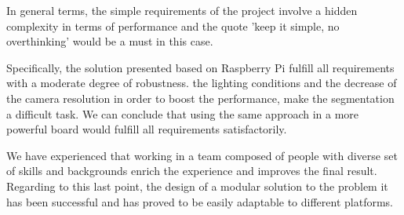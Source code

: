 In general terms, the simple requirements of the project involve a hidden complexity in terms of performance and the quote 'keep it simple, no overthinking' would be a must in this case.

Specifically, the solution presented based on Raspberry Pi fulfill all requirements with a moderate degree of robustness. the lighting conditions and the decrease of the camera resolution in order to boost the performance, make the segmentation a difficult task. We can conclude that using the same approach in a more powerful board would fulfill all requirements satisfactorily.

We have experienced that working in a team composed of people with diverse set of skills and backgrounds enrich the experience and improves the final result. Regarding to this last point, the design of a modular solution to the problem it has been successful and has proved to be easily adaptable to different platforms.